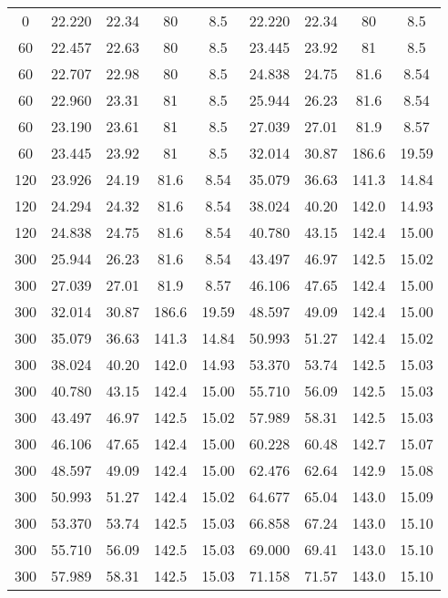 \documentclass[captions=tableheading]{scrartcl}
\begin{document}
\begin{table}
\begin{tabular}{S[table-format=3.0] S[table-format=2.3] S[table-format=2.2] S[table-format=3.1] S[table-format=2.2] S[table-format=3.3] S[table-format=3.2] S[table-format=3.1] S[table-format=2.2]}
       &  22.220 &  22.34 &  80   &  8.5  &   22.220 &  22.34 &  80   &  8.5 \\
     60 &  22.457 &  22.63 &  80   &  8.5  &   23.445 &  23.92 &  81   &  8.5 \\
     60 &  22.707 &  22.98 &  80   &  8.5  &   24.838 &  24.75 &  81.6 &  8.54 \\
     60 &  22.960 &  23.31 &  81   &  8.5  &   25.944 &  26.23 &  81.6 &  8.54 \\
     60 &  23.190 &  23.61 &  81   &  8.5  &   27.039 &  27.01 &  81.9 &  8.57 \\
     60 &  23.445 &  23.92 &  81   &  8.5  &   32.014 &  30.87 & 186.6 & 19.59 \\
    120 &  23.926 &  24.19 &  81.6 &  8.54 &   35.079 &  36.63 & 141.3 & 14.84 \\
    120 &  24.294 &  24.32 &  81.6 &  8.54 &   38.024 &  40.20 & 142.0 & 14.93 \\
    120 &  24.838 &  24.75 &  81.6 &  8.54 &   40.780 &  43.15 & 142.4 & 15.00 \\
    300 &  25.944 &  26.23 &  81.6 &  8.54 &   43.497 &  46.97 & 142.5 & 15.02 \\
    300 &  27.039 &  27.01 &  81.9 &  8.57 &   46.106 &  47.65 & 142.4 & 15.00 \\
    300 &  32.014 &  30.87 & 186.6 & 19.59 &   48.597 &  49.09 & 142.4 & 15.00 \\
    300 &  35.079 &  36.63 & 141.3 & 14.84 &   50.993 &  51.27 & 142.4 & 15.02 \\
    300 &  38.024 &  40.20 & 142.0 & 14.93 &   53.370 &  53.74 & 142.5 & 15.03 \\
    300 &  40.780 &  43.15 & 142.4 & 15.00 &   55.710 &  56.09 & 142.5 & 15.03 \\
    300 &  43.497 &  46.97 & 142.5 & 15.02 &   57.989 &  58.31 & 142.5 & 15.03 \\
    300 &  46.106 &  47.65 & 142.4 & 15.00 &   60.228 &  60.48 & 142.7 & 15.07 \\
    300 &  48.597 &  49.09 & 142.4 & 15.00 &   62.476 &  62.64 & 142.9 & 15.08 \\
    300 &  50.993 &  51.27 & 142.4 & 15.02 &   64.677 &  65.04 & 143.0 & 15.09 \\
    300 &  53.370 &  53.74 & 142.5 & 15.03 &   66.858 &  67.24 & 143.0 & 15.10 \\
    300 &  55.710 &  56.09 & 142.5 & 15.03 &   69.000 &  69.41 & 143.0 & 15.10 \\
    300 &  57.989 &  58.31 & 142.5 & 15.03 &   71.158 &  71.57 & 143.0 & 15.10 \\

\end{tabular}
\end{table}
\end{document}
